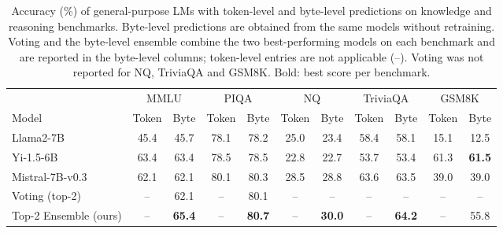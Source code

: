 \documentclass{article} %
\begin{document}
\begin{table}[t]
\caption{Accuracy (\%) of general-purpose LMs with token-level and byte-level predictions on knowledge and reasoning benchmarks. Byte-level predictions are obtained from the same models without retraining. Voting and the byte-level ensemble combine the two best-performing models on each benchmark and are reported in the byte-level columns; token-level entries are not applicable (--). Voting was not reported for NQ, TriviaQA and GSM8K. Bold: best score per benchmark.}
\label{tab:general}
\begin{center}
\small
\setlength{\tabcolsep}{4.5pt}
\begin{tabular}{lcccccccccc}
\toprule
 & \multicolumn{2}{c}{MMLU} & \multicolumn{2}{c}{PIQA} & \multicolumn{2}{c}{NQ} & \multicolumn{2}{c}{TriviaQA} & \multicolumn{2}{c}{GSM8K} \\
\cmidrule(lr){2-3} \cmidrule(lr){4-5} \cmidrule(lr){6-7} \cmidrule(lr){8-9} \cmidrule(lr){10-11}
Model & Token & Byte & Token & Byte & Token & Byte & Token & Byte & Token & Byte \\
\midrule
Llama2-7B & 45.4 & 45.7 & 78.1 & 78.2 & 25.0 & 23.4 & 58.4 & 58.1 & 15.1 & 12.5 \\
Yi-1.5-6B & 63.4 & 63.4 & 78.5 & 78.5 & 22.8 & 22.7 & 53.7 & 53.4 & 61.3 & \textbf{61.5} \\
Mistral-7B-v0.3 & 62.1 & 62.1 & 80.1 & 80.3 & 28.5 & 28.8 & 63.6 & 63.5 & 39.0 & 39.0 \\
\midrule
Voting (top-2) & -- & 62.1 & -- & 80.1 & -- & -- & -- & -- & -- & -- \\
Top-2 Ensemble (ours) & -- & \textbf{65.4} & -- & \textbf{80.7} & -- & \textbf{30.0} & -- & \textbf{64.2} & -- & 55.8 \\
\bottomrule
\end{tabular}
\end{center}
\end{table}
\end{document}
